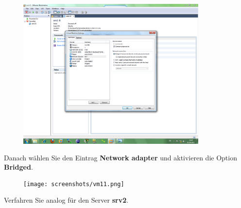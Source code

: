 \begin{figure}[H]
\begin{center}
\includegraphics[width=0.85\textwidth]{screenshots/vm10.png}
\end{center}
\end{figure}

\pagebreak
Danach wählen Sie den Eintrag \textbf{Network adapter} und aktivieren die Option \textbf{Bridged}.

\begin{figure}[H]
\begin{center}
\texttt{[image: screenshots/vm11.png]}
\end{center}
\end{figure}

Verfahren Sie analog für den Server \textbf{srv2}.